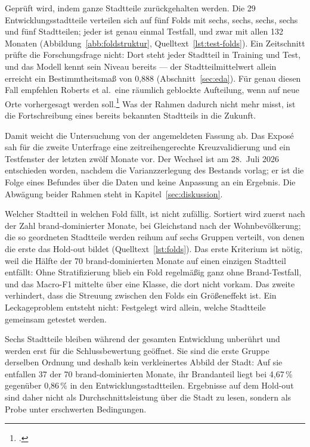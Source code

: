 Geprüft wird, indem ganze Stadtteile zurückgehalten werden. Die 29
Entwicklungsstadtteile verteilen sich auf fünf Folds mit sechs, sechs, sechs,
sechs und fünf Stadtteilen; jeder ist genau einmal Testfall, und zwar mit allen
132 Monaten (Abbildung~\ref{abb:foldstruktur}, Quelltext~\ref{lst:test-folds}).
Ein Zeitschnitt prüfte die Forschungsfrage nicht: Dort steht jeder Stadtteil in
Training und Test, und das Modell kennt sein Niveau bereits --- der
Stadtteilmittelwert allein erreicht ein Bestimmtheitsmaß von 0,888
(Abschnitt~\ref{sec:eda}). Für genau diesen Fall empfehlen Roberts et al.\ eine
räumlich geblockte Aufteilung, wenn auf neue Orte vorhergesagt werden
soll.\footcite[925]{Roberts2017} Was der Rahmen dadurch nicht mehr misst, ist
die Fortschreibung eines bereits bekannten Stadtteils in die Zukunft.

Damit weicht die Untersuchung von der angemeldeten Fassung ab. Das Exposé sah
für die zweite Unterfrage eine zeitreihengerechte Kreuzvalidierung und ein
Testfenster der letzten zwölf Monate vor. Der Wechsel ist am 28.~Juli 2026
entschieden worden, nachdem die Varianzzerlegung des Bestands vorlag; er ist
die Folge eines Befundes über die Daten und keine Anpassung an ein Ergebnis.
Die Abwägung beider Rahmen steht in Kapitel~\ref{sec:diskussion}.

Welcher Stadtteil in welchen Fold fällt, ist nicht zufällig. Sortiert wird
zuerst nach der Zahl brand-dominierter Monate, bei Gleichstand nach der
Wohnbevölkerung; die so geordneten Stadtteile werden reihum auf sechs Gruppen
verteilt, von denen die erste das Hold-out bildet (Quelltext~\ref{lst:folds}).
Das erste Kriterium ist nötig, weil die Hälfte der 70 brand-dominierten Monate
auf einen einzigen Stadtteil entfällt: Ohne Stratifizierung blieb ein Fold
regelmäßig ganz ohne Brand-Testfall, und das Macro-F1 mittelte über eine
Klasse, die dort nicht vorkam. Das zweite verhindert, dass die Streuung
zwischen den Folds ein Größeneffekt ist. Ein Leckageproblem entsteht nicht:
Festgelegt wird allein, welche Stadtteile gemeinsam getestet werden.

Sechs Stadtteile bleiben während der gesamten Entwicklung unberührt und werden
erst für die Schlussbewertung geöffnet. Sie sind die erste Gruppe derselben
Ordnung und deshalb kein verkleinertes Abbild der Stadt: Auf sie entfallen 37
der 70 brand-dominierten Monate, ihr Brandanteil liegt bei 4,67\,\% gegenüber
0,86\,\% in den Entwicklungsstadtteilen. Ergebnisse auf dem Hold-out sind daher
nicht als Durchschnittsleistung über die Stadt zu lesen, sondern als Probe
unter erschwerten Bedingungen.


